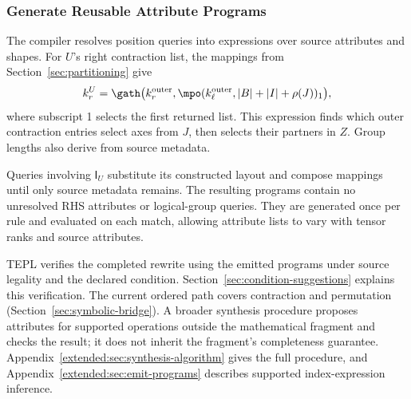 \FloatBarrier
\subsubsection{Generate Reusable Attribute Programs}
\label{sec:emit-programs}
The compiler resolves position queries into expressions over source
attributes and shapes. For $U$'s right contraction list, the mappings from
Section~\ref{sec:partitioning} give
\begin{equation}
 k_r^U=\gath\bigl(k_r^{\mathrm{outer}},
 \mpo(k_\ell^{\mathrm{outer}},|B|+|I|+\rho(J))_1\bigr),
 \label{eq:source-only-example}
\end{equation}
where subscript 1 selects the first returned list. This expression finds
which outer contraction entries select axes from $J$, then selects their
partners in $Z$. Group lengths also derive from source metadata.

Queries involving $\mathsf{I}_U$ substitute its constructed layout and
compose mappings until only source metadata remains. The resulting programs
contain no unresolved RHS attributes or logical-group queries. They are
generated once per rule and evaluated on each match, allowing attribute
lists to vary with tensor ranks and source attributes.

TEPL verifies the completed rewrite using the emitted programs under source
legality and the declared  condition.
Section~\ref{sec:condition-suggestions} explains this verification.
The current ordered path covers contraction and permutation
(Section~\ref{sec:symbolic-bridge}). A broader synthesis procedure proposes attributes for supported
operations outside the mathematical fragment and checks the result; it
does not inherit the fragment's completeness guarantee.
Appendix~\ref{extended:sec:synthesis-algorithm} gives the full procedure,
and Appendix~\ref{extended:sec:emit-programs} describes supported
index-expression inference.
